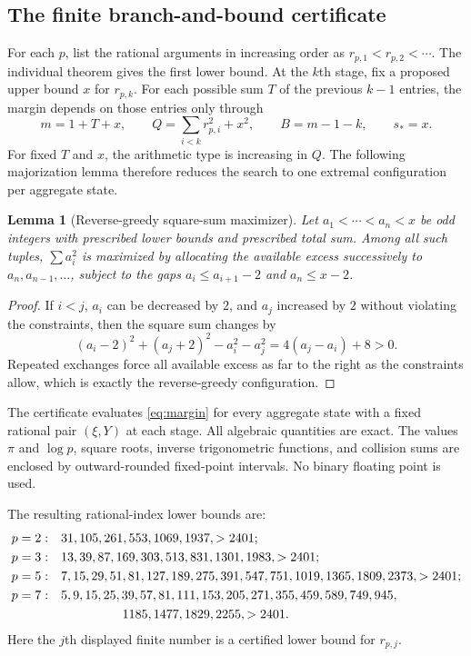 \documentclass[11pt]{article}
\newtheorem{lemma}[lemma]{Lemma}
\theoremstyle{definition}
\theoremstyle{remark}
\begin{document}
\subsection{The finite branch-and-bound certificate}

For each $p$, list the rational arguments in increasing order as
$r_{p,1}<r_{p,2}<\cdots$.  The individual theorem gives the first lower bound.
At the $k$th stage, fix a proposed upper bound $x$ for $r_{p,k}$.  For each
possible sum $T$ of the previous $k-1$ entries, the margin depends on those
entries only through
\[
 m=1+T+x,
 \qquad Q=\sum_{i<k}r_{p,i}^2+x^2,
 \qquad B=m-1-k,
 \qquad s_*=x.
\]
For fixed $T$ and $x$, the arithmetic type is increasing in $Q$.  The following
majorization lemma therefore reduces the search to one extremal configuration
per aggregate state.

\begin{lemma}[Reverse-greedy square-sum maximizer]\label{lem:convex-search}
Let $a_1<\cdots<a_n<x$ be odd integers with prescribed lower bounds and
prescribed total sum.  Among all such tuples, $\sum a_i^2$ is maximized by
allocating the available excess successively to $a_n,a_{n-1},\ldots$, subject
to the gaps $a_i\le a_{i+1}-2$ and $a_n\le x-2$.
\end{lemma}

\begin{proof}
If $i<j$, $a_i$ can be decreased by $2$, and $a_j$ increased by $2$ without
violating the constraints, then the square sum changes by
\[
 (a_i-2)^2+(a_j+2)^2-a_i^2-a_j^2=4(a_j-a_i)+8>0.
\]
Repeated exchanges force all available excess as far to the right as the
constraints allow, which is exactly the reverse-greedy configuration.
\end{proof}

The certificate evaluates \eqref{eq:margin} for every aggregate state with a
fixed rational pair $(\xi,Y)$ at each stage.  All algebraic quantities are
exact.  The values $\pi$ and $\log p$, square roots, inverse trigonometric
functions, and collision sums are enclosed by outward-rounded fixed-point
intervals.  No binary floating point is used.

The resulting rational-index lower bounds are:
\begin{align*}
 p=2:\quad&31,105,261,553,1069,1937,>2401;\\
 p=3:\quad&13,39,87,169,303,513,831,1301,1983,>2401;\\
 p=5:\quad&7,15,29,51,81,127,189,275,391,547,751,1019,1365,1809,2373,>2401;\\
 p=7:\quad&5,9,15,25,39,57,81,111,153,205,271,355,459,589,749,945,\\
 &\hspace{17mm}1185,1477,1829,2255,>2401.
\end{align*}
Here the $j$th displayed finite number is a certified lower bound for
$r_{p,j}$.
\end{document}
